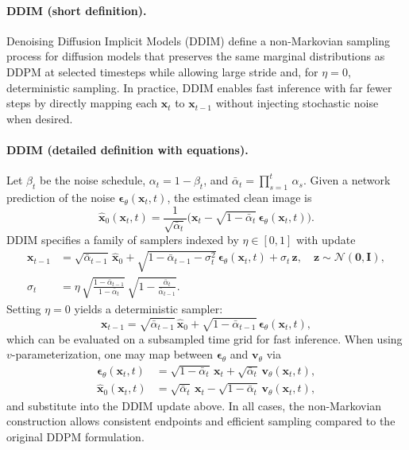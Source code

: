 
\paragraph{DDIM (short definition).}
Denoising Diffusion Implicit Models (DDIM) \cite{song2021ddim} define a non-Markovian sampling process for diffusion models that preserves the same marginal distributions as DDPM at selected timesteps while allowing large stride and, for $\eta=0$, deterministic sampling. In practice, DDIM enables fast inference with far fewer steps by directly mapping each $\mathbf{x}_t$ to $\mathbf{x}_{t-1}$ without injecting stochastic noise when desired.

\paragraph{DDIM (detailed definition with equations).}
Let $\beta_t$ be the noise schedule, $\alpha_t = 1-\beta_t$, and $\bar{\alpha}_t = \prod_{s=1}^t \, \alpha_s$. Given a network prediction of the noise $\boldsymbol{\epsilon}_\theta(\mathbf{x}_t, t)$, the estimated clean image is
\begin{equation}
    \mathbf{\hat{x}}_0(\mathbf{x}_t, t) = \frac{1}{\sqrt{\bar{\alpha}_t}}\Big(\mathbf{x}_t - \sqrt{1-\bar{\alpha}_t}\,\boldsymbol{\epsilon}_\theta(\mathbf{x}_t, t)\Big).
\end{equation}
DDIM specifies a family of samplers indexed by $\eta\in[0,1]$ with update
\begin{align}
    \mathbf{x}_{t-1} &= \sqrt{\bar{\alpha}_{t-1}}\, \mathbf{\hat{x}}_0 
    + \sqrt{1-\bar{\alpha}_{t-1}-\sigma_t^2}\, \boldsymbol{\epsilon}_\theta(\mathbf{x}_t, t)
    + \sigma_t \, \mathbf{z}, \quad \mathbf{z}\sim\mathcal{N}(\mathbf{0}, \mathbf{I}), \\
    \sigma_t &= \eta\, \sqrt{\frac{1-\bar{\alpha}_{t-1}}{1-\bar{\alpha}_t}}\, \sqrt{1-\frac{\bar{\alpha}_t}{\bar{\alpha}_{t-1}}}.
\end{align}
Setting $\eta=0$ yields a deterministic sampler:
\begin{equation}
    \mathbf{x}_{t-1} = \sqrt{\bar{\alpha}_{t-1}}\, \mathbf{\hat{x}}_0 + \sqrt{1-\bar{\alpha}_{t-1}}\, \boldsymbol{\epsilon}_\theta(\mathbf{x}_t, t),
\end{equation}
which can be evaluated on a subsampled time grid for fast inference. When using $v$-parameterization, one may map between $\boldsymbol{\epsilon}_\theta$ and $\mathbf{v}_\theta$ via
\begin{align}
    \boldsymbol{\epsilon}_\theta(\mathbf{x}_t, t) &= \sqrt{1-\bar{\alpha}_t}\,\mathbf{x}_t + \sqrt{\bar{\alpha}_t}\,\mathbf{v}_\theta(\mathbf{x}_t, t), \\
    \mathbf{\hat{x}}_0(\mathbf{x}_t, t) &= \sqrt{\bar{\alpha}_t}\,\mathbf{x}_t - \sqrt{1-\bar{\alpha}_t}\,\mathbf{v}_\theta(\mathbf{x}_t, t),
\end{align}
and substitute into the DDIM update above. In all cases, the non-Markovian construction allows consistent endpoints and efficient sampling compared to the original DDPM formulation.


